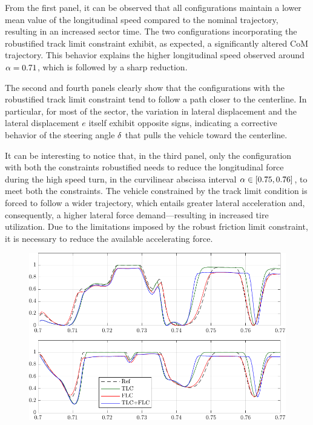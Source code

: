 From the first panel, it can be observed that all configurations maintain a lower mean value of the longitudinal speed compared to the nominal trajectory, resulting in an increased sector time. The two configurations incorporating the robustified track limit constraint exhibit, as expected, a significantly altered CoM trajectory. This behavior explains the higher longitudinal speed observed around $\alpha = 0.71$, which is followed by a sharp reduction. 

The second and fourth panels clearly show that the configurations with the robustified track limit constraint tend to follow a path closer to the centerline. In particular, for most of the sector, the variation in lateral displacement and the lateral displacement $e$ itself exhibit opposite signs, indicating a corrective behavior of the steering angle $\delta$ that pulls the vehicle toward the centerline.

It can be interesting to notice that, in the third panel, only the configuration with both the constraints robustified needs to reduce the longitudinal force during the high speed turn, in the curvilinear abscissa interval $\alpha\in\left[0.75, 0.76\right]$, to meet both the constraints. 
The vehicle constrained by the track limit condition is forced to follow a wider trajectory, which entails greater lateral acceleration and, consequently, a higher lateral force demand---resulting in increased tire utilization. Due to the limitations imposed by the robust friction limit constraint, it is necessary to reduce the available accelerating force.

\begin{figure}
	\centering
	\includegraphics{Fig/ol_saturation.pdf}
	\caption{}
	\label{fig:ol_saturation}
\end{figure}

